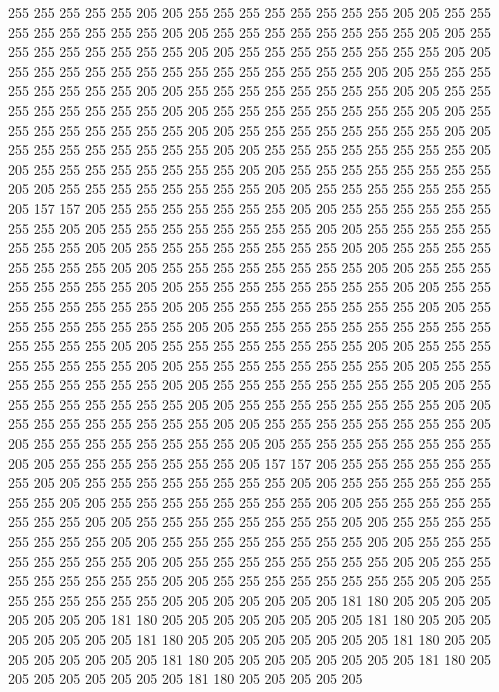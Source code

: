255 255 255 255 255 205 205 255 255 255 255 255 255 255 255 205 205 255 255 255
255 255 255 255 255 205 205 255 255 255 255 255 255 255 255 205 205 255 255 255
255 255 255 255 255 205 205 255 255 255 255 255 255 255 255 205 205 255 255 255
255 255 255 255 255 255 255 255 255 255 255 205 205 255 255 255 255 255 255 255
255 205 205 255 255 255 255 255 255 255 255 205 205 255 255 255 255 255 255 255
255 205 205 255 255 255 255 255 255 255 255 205 205 255 255 255 255 255 255 255
255 205 205 255 255 255 255 255 255 255 255 205 205 255 255 255 255 255 255 255
255 205 205 255 255 255 255 255 255 255 255 205 205 255 255 255 255 255 255 255
255 205 205 255 255 255 255 255 255 255 255 205 205 255 255 255 255 255 255 255
255 205 205 255 255 255 255 255 255 255 205 157 157 205 255 255 255 255 255 255
255 205 205 255 255 255 255 255 255 255 255 205 205 255 255 255 255 255 255 255
255 205 205 255 255 255 255 255 255 255 255 205 205 255 255 255 255 255 255 255
255 205 205 255 255 255 255 255 255 255 255 205 205 255 255 255 255 255 255 255
255 205 205 255 255 255 255 255 255 255 255 205 205 255 255 255 255 255 255 255
255 205 205 255 255 255 255 255 255 255 255 205 205 255 255 255 255 255 255 255
255 205 205 255 255 255 255 255 255 255 255 205 205 255 255 255 255 255 255 255
255 255 255 255 255 255 255 205 205 255 255 255 255 255 255 255 255 205 205 255
255 255 255 255 255 255 255 205 205 255 255 255 255 255 255 255 255 205 205 255
255 255 255 255 255 255 255 205 205 255 255 255 255 255 255 255 255 205 205 255
255 255 255 255 255 255 255 205 205 255 255 255 255 255 255 255 255 205 205 255
255 255 255 255 255 255 255 205 205 255 255 255 255 255 255 255 255 205 205 255
255 255 255 255 255 255 255 205 205 255 255 255 255 255 255 255 255 205 205 255
255 255 255 255 255 255 205 157 157 205 255 255 255 255 255 255 255 205 205 255
255 255 255 255 255 255 255 205 205 255 255 255 255 255 255 255 255 205 205 255
255 255 255 255 255 255 255 205 205 255 255 255 255 255 255 255 255 205 205 255
255 255 255 255 255 255 255 205 205 255 255 255 255 255 255 255 255 205 205 255
255 255 255 255 255 255 255 205 205 255 255 255 255 255 255 255 255 205 205 255
255 255 255 255 255 255 255 205 205 255 255 255 255 255 255 255 255 205 205 255
255 255 255 255 255 255 255 205 205 255 255 255 255 255 255 255 205 205 205 205
205 205 205 181 180 205 205 205 205 205 205 205 205 181 180 205 205 205 205 205
205 205 205 181 180 205 205 205 205 205 205 205 205 181 180 205 205 205 205 205
205 205 205 181 180 205 205 205 205 205 205 205 205 181 180 205 205 205 205 205
205 205 205 181 180 205 205 205 205 205 205 205 205 181 180 205 205 205 205 205
